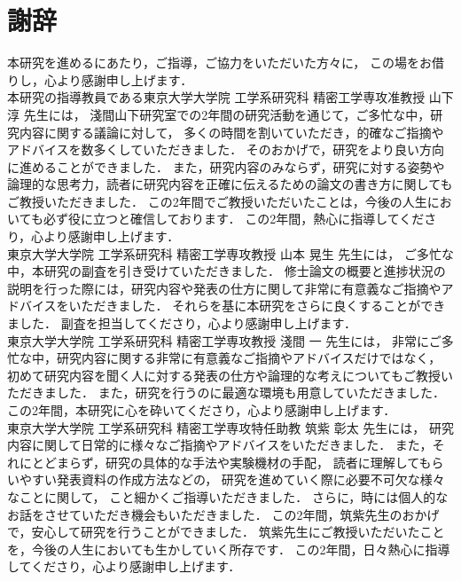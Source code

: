 \chapter*{謝辞}
\thispagestyle{empty}
\label{thankyou}

\newpage

本研究を進めるにあたり，ご指導，ご協力をいただいた方々に，
この場をお借りし，心より感謝申し上げます．
\\

本研究の指導教員である東京大学大学院 工学系研究科 精密工学専攻准教授 山下 淳 先生には，
淺間山下研究室での2年間の研究活動を通じて，ご多忙な中，研究内容に関する議論に対して，
多くの時間を割いていただき，的確なご指摘やアドバイスを数多くしていただきました．
そのおかげで，研究をより良い方向に進めることができました．
また，研究内容のみならず，研究に対する姿勢や
論理的な思考力，読者に研究内容を正確に伝えるための論文の書き方に関してもご教授いただきました．
この2年間でご教授いただいたことは，今後の人生においても必ず役に立つと確信しております．
この2年間，熱心に指導してくださり，心より感謝申し上げます．
\\

東京大学大学院 工学系研究科 精密工学専攻教授 山本 晃生 先生には，
ご多忙な中，本研究の副査を引き受けていただきました．
修士論文の概要と進捗状況の説明を行った際には，研究内容や発表の仕方に関して非常に有意義なご指摘やアドバイスをいただきました．
それらを基に本研究をさらに良くすることができました．
副査を担当してくださり，心より感謝申し上げます．
\\

東京大学大学院 工学系研究科 精密工学専攻教授 淺間 一 先生には，
非常にご多忙な中，研究内容に関する非常に有意義なご指摘やアドバイスだけではなく，
初めて研究内容を聞く人に対する発表の仕方や論理的な考えについてもご教授いただきました．
また，研究を行うのに最適な環境も用意していただきました．
この2年間，本研究に心を砕いてくださり，心より感謝申し上げます．
\\

東京大学大学院 工学系研究科 精密工学専攻特任助教 筑紫 彰太 先生には，
研究内容に関して日常的に様々なご指摘やアドバイスをいただきました．
また，それにとどまらず，研究の具体的な手法や実験機材の手配，
読者に理解してもらいやすい発表資料の作成方法などの，
研究を進めていく際に必要不可欠な様々なことに関して，
こと細かくご指導いただきました．
さらに，時には個人的なお話をさせていただき機会もいただきました．
この2年間，筑紫先生のおかげで，安心して研究を行うことができました．
筑紫先生にご教授いただいたことを，今後の人生においても生かしていく所存です．
この2年間，日々熱心に指導してくださり，心より感謝申し上げます．
\\

